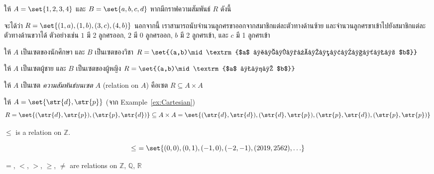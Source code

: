 \begin{example}
ให้ $A=\set{1,2,3,4}$ และ $B=\set{a,b,c,d}$ \enskip หากมีกราฟความสัมพันธ์ $R$ ดังนี้
\begin{center}
\end{center}
จะได้ว่า $R=\set{(1,a),(1,b),(3,c),(4,b)}$ \enskip นอกจากนี้ เราสามารถนับจำนวนลูกศรขาออกจากสมาชิกแต่ละตัวทางด้านซ้าย และจำนวนลูกศรขาเข้าไปยังสมาชิกแต่ละตัวทางด้านขวาได้ ตัวอย่างเช่น $1$ มี 2 ลูกศรออก, $2$ มี 0 ลูกศรออก, $b$ มี 2 ลูกศรเข้า, และ $c$ มี 1 ลูกศรเข้า
\end{example}

\begin{example}
ให้ $A$ เป็นเซตของนักศึกษา และ $B$ เป็นเซตของวิชา \enskip $R=\set{(a,b)\mid\textrm{$a$ ลงทะเบียนวิชา $b$}}$
\end{example}

\begin{example}
ให้ $A$ เป็นเซตผู้ชาย และ $B$ เป็นเซตของผู้หญิง \enskip $R=\set{(a,b)\mid\textrm{$a$ ชอบ $b$}}$
\end{example}

\begin{definition}
ให้ $A$ เป็นเซต \enskip \emph{ความสัมพันธ์บนเซต $A$} (relation on $A$) คือเซต $R\subseteq A\times A$
\end{definition}
%
\begin{example}
ให้ $A=\set{\str{d},\str{p}}$ (จาก Example~\ref{ex:Cartesian}) \enskip \[R=\set{(\str{d},\str{p}),(\str{p},\str{d})}\subseteq A\times A=\set{(\str{d},\str{d}),(\str{d},\str{p}),(\str{p},\str{d}),(\str{p},\str{p})}\]
\end{example}
%
\begin{example}
$\leq$ is a relation on $\mathbb{Z}$.

\[\leq\ =\set{(0,0),(0,1),(-1,0),(-2,-1),(2019,2562),\ldots}\]
\end{example}

\begin{example}
$=$, $<$, $>$, $\geq$, $\neq$ are relations on $\mathbb{Z}$, $\mathbb{Q}$, $\mathbb{R}$
\end{example}

